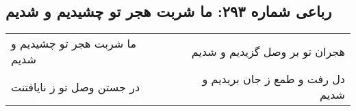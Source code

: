 \begin{center}
\section*{رباعی شماره ۲۹۳: ما شربت هجر تو چشیدیم و شدیم}
\label{sec:sh293}
\begin{longtable}{l p{0.5cm} r}
ما شربت هجر تو چشیدیم و شدیم
&&
هجران تو بر وصل گزیدیم و شدیم
\\
در جستن وصل تو ز نایافتنت
&&
دل رفت و طمع ز جان بریدیم و شدیم
\\
\end{longtable}
\end{center}
